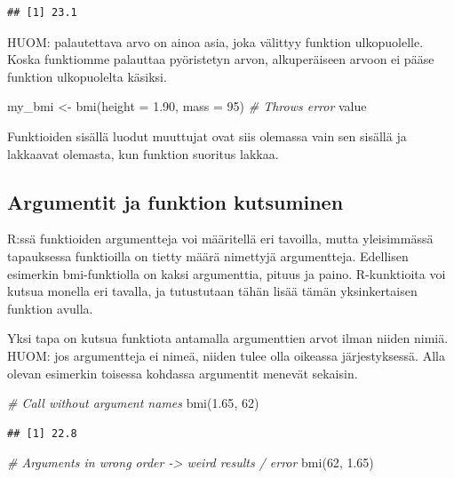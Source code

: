 \documentclass[
]{book}
\newenvironment{Shaded}{\begin{snugshade}}{\end{snugshade}}
\newcommand{\AttributeTok}[1]{\textcolor[rgb]{0.77,0.63,0.00}{#1}}
\newcommand{\CommentTok}[1]{\textcolor[rgb]{0.56,0.35,0.01}{\textit{#1}}}
\newcommand{\DecValTok}[1]{\textcolor[rgb]{0.00,0.00,0.81}{#1}}
\newcommand{\FloatTok}[1]{\textcolor[rgb]{0.00,0.00,0.81}{#1}}
\newcommand{\FunctionTok}[1]{\textcolor[rgb]{0.00,0.00,0.00}{#1}}
\newcommand{\NormalTok}[1]{#1}
\newcommand{\OtherTok}[1]{\textcolor[rgb]{0.56,0.35,0.01}{#1}}
\begin{document}
\begin{verbatim}
## [1] 23.1
\end{verbatim}

HUOM: palautettava arvo on ainoa asia, joka välittyy funktion ulkopuolelle. Koska funktiomme palauttaa pyöristetyn arvon, alkuperäiseen arvoon ei pääse funktion ulkopuolelta käsiksi.

\begin{Shaded}
\begin{Highlighting}[]
\NormalTok{my\_bmi }\OtherTok{\textless{}{-}} \FunctionTok{bmi}\NormalTok{(}\AttributeTok{height =} \FloatTok{1.90}\NormalTok{, }\AttributeTok{mass =} \DecValTok{95}\NormalTok{)}
\CommentTok{\# Throws error}
\NormalTok{value}
\end{Highlighting}
\end{Shaded}

Funktioiden sisällä luodut muuttujat ovat siis olemassa vain sen sisällä ja lakkaavat olemasta, kun funktion suoritus lakkaa.

\hypertarget{argumentit-ja-funktion-kutsuminen}{%
\subsection{Argumentit ja funktion kutsuminen}\label{argumentit-ja-funktion-kutsuminen}}

R:ssä funktioiden argumentteja voi määritellä eri tavoilla, mutta yleisimmässä tapauksessa funktioilla on tietty määrä nimettyjä argumentteja. Edellisen esimerkin bmi-funktiolla on kaksi argumenttia, pituus ja paino. R-kunktioita voi kutsua monella eri tavalla, ja tutustutaan tähän lisää tämän yksinkertaisen funktion avulla.

Yksi tapa on kutsua funktiota antamalla argumenttien arvot ilman niiden nimiä. HUOM: jos argumentteja ei nimeä, niiden tulee olla oikeassa järjestyksessä. Alla olevan esimerkin toisessa kohdassa argumentit menevät sekaisin.

\begin{Shaded}
\begin{Highlighting}[]
\CommentTok{\# Call without argument names}
\FunctionTok{bmi}\NormalTok{(}\FloatTok{1.65}\NormalTok{, }\DecValTok{62}\NormalTok{)}
\end{Highlighting}
\end{Shaded}

\begin{verbatim}
## [1] 22.8
\end{verbatim}

\begin{Shaded}
\begin{Highlighting}[]
\CommentTok{\# Arguments in wrong order {-}\textgreater{} weird results / error}
\FunctionTok{bmi}\NormalTok{(}\DecValTok{62}\NormalTok{, }\FloatTok{1.65}\NormalTok{)}
\end{Highlighting}
\end{Shaded}
\end{document}

